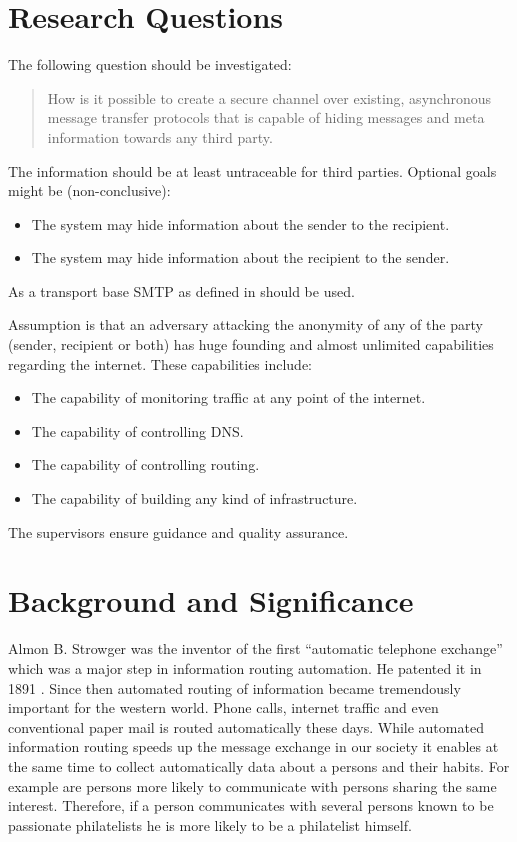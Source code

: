 \documentclass[twocolumn,a4paper,10pt,english]{scrartcl}
\newenvironment{myitemize}{\begin{itemize}\setlength{\itemsep}{0em}}{\end{itemize}}
\begin{document}
\section{Research Questions}
The following question should be investigated: 
\begin{quote}
How is it possible to create a secure channel over existing, asynchronous message transfer protocols that is capable of hiding messages and meta information towards any third party. 
\end{quote}
The information should be at least untraceable for third parties. Optional goals might be (non-conclusive):
\begin{myitemize}
\item The system may hide information about the sender to the recipient.
\item The system may hide information about the recipient to the sender. 
\end{myitemize}
As a transport base SMTP as defined in \cite{RFC5321} should be used. \par
Assumption is that an adversary attacking the anonymity of any of the party (sender, recipient or both) has huge founding and almost unlimited capabilities regarding the internet. These capabilities include:
\begin{myitemize}
\item The capability of monitoring traffic at any point of the internet.
\item The capability of controlling DNS.
\item The capability of controlling routing.
\item The capability of building any kind of infrastructure.
\end{myitemize}
The supervisors ensure guidance and quality assurance.
\section{Background and Significance}
Almon B. Strowger was the inventor of the first ``automatic telephone exchange'' which was a major step in information routing automation. He patented it in 1891 \cite{strowger}. Since then automated routing of information became tremendously important for the western world. Phone calls, internet traffic and even conventional paper mail is routed automatically these days. While automated information routing speeds up the message exchange in our society it enables at the same time to collect automatically data about a persons and their habits. For example are persons more likely to communicate with persons sharing the same interest. Therefore, if a person communicates with several persons known to be passionate philatelists he is more likely to be a philatelist himself.\par
\end{document}
